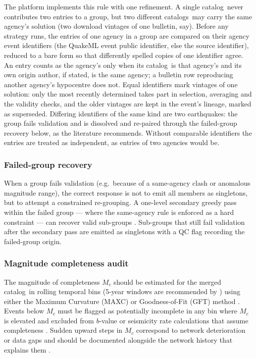 \documentclass[12pt]{article}
\newcommand{\catalog}{catalog}
\newcommand{\catalogs}{catalogs}
\begin{document}
The platform implements this rule with one refinement.  A single \catalog\
never contributes two entries to a group, but two different \catalogs\ may
carry the same agency's solution (two download vintages of one bulletin, say).
Before any strategy runs, the entries of one agency in a group are compared on
their agency event identifiers (the QuakeML event public identifier, else the
source identifier), reduced to a bare form so that differently spelled copies
of one identifier agree.  An entry counts as the agency's only when its
\catalog\ is that agency's and its own origin author, if stated, is the same
agency; a bulletin row reproducing another agency's hypocentre does not.  Equal
identifiers mark vintages of one solution: only the most recently determined
takes part in selection, averaging and the validity checks, and the older
vintages are kept in the event's lineage, marked as superseded.  Differing
identifiers of the same kind are two earthquakes: the group fails validation
and is dissolved and re-paired through the failed-group recovery below, as the
literature recommends.  Without comparable identifiers the entries are treated
as independent, as entries of two agencies would be.

\subsubsection{Failed-group recovery}

When a group fails validation (e.g.\ because of a same-agency clash or
anomalous magnitude range), the correct response is not to emit all members as
singletons, but to attempt a constrained re-grouping.  A one-level secondary
greedy pass within the failed group — where the same-agency rule is enforced as
a hard constraint — can recover valid sub-groups \citep{Patton2016, Tanaka2022}.
Sub-groups that still fail validation after the secondary pass are emitted as
singletons with a QC flag recording the failed-group origin.

\subsubsection{Magnitude completeness audit}
\label{sec:mc}

The magnitude of completeness $M_c$ should be estimated for the merged \catalog\
in rolling temporal bins (5-year windows are recommended by \citealt{Woessner2005})
using either the Maximum Curvature (MAXC) or Goodness-of-Fit (GFT) method
\citep{Wiemer2000}.  Events below $M_c$ must be flagged as potentially incomplete
in any bin where $M_c$ is elevated and excluded from $b$-value or seismicity rate
calculations that assume completeness \citep{Aki1965}.  Sudden upward steps in
$M_c$ correspond to network deterioration or data gaps and should be documented
alongside the network history that explains them \citep{Woessner2005}.
\end{document}
